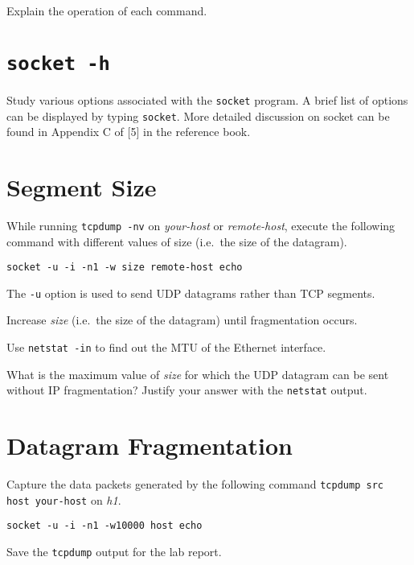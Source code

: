 \documentclass{../UTNetLab}
\begin{document}
    \begin{report}
    \item Explain the operation of each command.
    \end{report}

\section{\texttt{socket -h}}
    Study various options associated with the \lstinline{socket} program.
    A brief list of options can be displayed by typing \lstinline{socket}. More detailed discussion on socket can be found in
    Appendix C of [5] in the reference book.

\section{Segment Size}
    While running \lstinline{tcpdump -nv} on \textit{your-host} or \textit{remote-host}, execute the following command with different values of size (i.e.\  the size of the datagram).

    \begin{lstlisting}[emph={size, remote-host}]
socket -u -i -n1 -w size remote-host echo
    \end{lstlisting}
    
    The \lstinline{-u} option is used to send UDP datagrams rather than TCP segments.

    Increase \textit{size} (i.e.\  the size of the datagram) until fragmentation occurs.

    Use \lstinline{netstat -in} to find out the MTU of the Ethernet interface.

    \begin{report}
    \item What is the maximum value of \textit{size} for which the UDP datagram can be sent without IP fragmentation?
    Justify your answer with the \lstinline{netstat} output.
    \end{report}

\section{Datagram Fragmentation}
    Capture the data packets generated by the following command \lstinline[emph={your-host, remote-host}]{tcpdump src host your-host} on \textit{h1}.

    \begin{lstlisting}[emph={host}]
socket -u -i -n1 -w10000 host echo
    \end{lstlisting}
    Save the \lstinline{tcpdump} output for the lab report.
    
\end{document}
